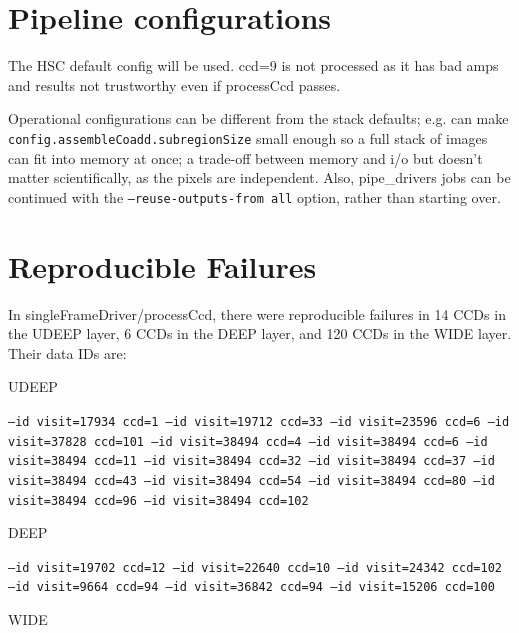 \section{Pipeline configurations}
The HSC default config will be used. ccd=9 is not processed as it has bad amps and results not trustworthy even if processCcd passes.

Operational configurations can be different from the stack defaults; e.g. can make \texttt{config.assembleCoadd.subregionSize} small enough so a full stack of images can fit into memory at once; a trade-off between memory and i/o but doesn't matter scientifically, as the pixels are independent. Also, pipe\_drivers jobs can be continued with the \texttt{--reuse-outputs-from all} option, rather than starting over.


\section{Reproducible Failures}
In singleFrameDriver/processCcd, there were reproducible failures in 14 CCDs in the UDEEP layer, 6 CCDs in the DEEP layer, and 120 CCDs in the WIDE layer.  Their data IDs are:

UDEEP

\texttt{--id visit=17934 ccd=1 --id visit=19712 ccd=33 --id visit=23596 ccd=6 --id visit=37828 ccd=101 --id visit=38494 ccd=4 --id visit=38494 ccd=6 --id visit=38494 ccd=11 --id visit=38494 ccd=32 --id visit=38494 ccd=37 --id visit=38494 ccd=43 --id visit=38494 ccd=54 --id visit=38494 ccd=80 --id visit=38494 ccd=96 --id visit=38494 ccd=102}

DEEP

\texttt{--id visit=19702 ccd=12 --id visit=22640 ccd=10 --id visit=24342 ccd=102 --id visit=9664 ccd=94 --id visit=36842 ccd=94 --id visit=15206 ccd=100}

WIDE

